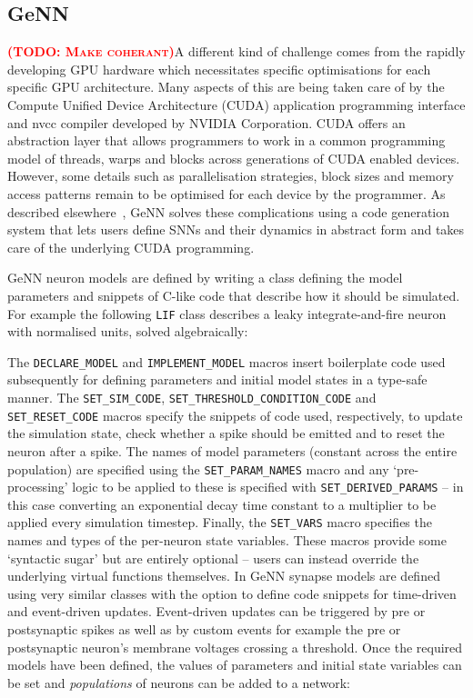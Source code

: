 \documentclass[utf8]{frontiersSCNS} %
\newcommand{\todo}[1]{\textbf{\textsc{\textcolor{red}{(TODO: #1)}}}}
\begin{document}
\subsection{GeNN}
\label{sec:method/genn}
\todo{Make coherant}A different kind of challenge comes from the rapidly developing GPU hardware which necessitates specific optimisations for each specific GPU architecture.
Many aspects of this are being taken care of by the Compute Unified Device Architecture (CUDA) application programming interface and nvcc compiler developed by NVIDIA Corporation.
CUDA offers an abstraction layer that allows programmers to work in a common programming model of threads, warps and blocks across generations of CUDA enabled devices.
However, some details such as parallelisation strategies, block sizes and memory access patterns remain to be optimised for each device by the programmer.
As described elsewhere~\cite{Yavuz2016}, GeNN solves these complications using a code generation system that lets users define SNNs and their dynamics in abstract form and takes care of the underlying CUDA programming.

GeNN neuron models are defined by writing a class defining the model parameters and snippets of C-like code that describe how it should be simulated.
For example the following \lstinline{LIF} class describes a leaky integrate-and-fire neuron with normalised units, solved algebraically:



The \lstinline{DECLARE_MODEL} and \lstinline{IMPLEMENT_MODEL} macros insert boilerplate code used subsequently for defining parameters and initial model states in a type-safe manner.
The \lstinline{SET_SIM_CODE}, \lstinline{SET_THRESHOLD_CONDITION_CODE} and \lstinline{SET_RESET_CODE} macros specify the snippets of code used, respectively, to update the simulation state, check whether a spike should be emitted and to reset the neuron after a spike.
The names of model parameters (constant across the entire population) are specified using the \lstinline{SET_PARAM_NAMES} macro and any `pre-processing' logic to be applied to these is specified with \lstinline{SET_DERIVED_PARAMS} -- in this case converting an exponential decay time constant to a multiplier to be applied every simulation timestep.
Finally, the \lstinline{SET_VARS} macro specifies the names and types of the per-neuron state variables.
These macros provide some `syntactic sugar' but are entirely optional -- users can instead override the underlying virtual functions themselves.
In GeNN synapse models are defined using very similar classes with the option to define code snippets for time-driven and event-driven updates.
Event-driven updates can be triggered by pre or postsynaptic spikes as well as by custom events for example the pre or postsynaptic neuron's membrane voltages crossing a threshold.
Once the required models have been defined, the values of parameters and initial state variables can be set and \textit{populations} of neurons can be added to a network:
%

\end{document}
